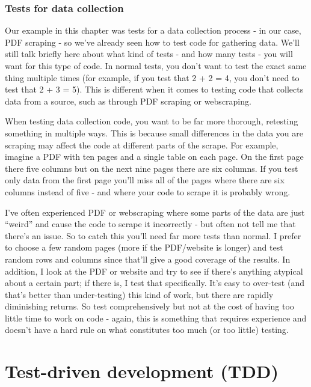 \documentclass[
  a4paper,
]{krantz}
\begin{document}
\hypertarget{tests-for-data-collection}{%
\subsubsection{Tests for data
collection}\label{tests-for-data-collection}}

Our example in this chapter was tests for a data collection
process - in our case, PDF scraping - so we've already seen
how to test code for gathering data. We'll still talk
briefly here about what kind of tests - and how many tests -
you will want for this type of code. In normal tests, you
don't want to test the exact same thing multiple times (for
example, if you test that 2 + 2 = 4, you don't need to test
that 2 + 3 = 5). This is different when it comes to testing
code that collects data from a source, such as through PDF
scraping or webscraping.

When testing data collection code, you want to be far more
thorough, retesting something in multiple ways. This is
because small differences in the data you are scraping may
affect the code at different parts of the scrape. For
example, imagine a PDF with ten pages and a single table on
each page. On the first page there five columns but on the
next nine pages there are six columns. If you test only data
from the first page you'll miss all of the pages where there
are six columns instead of five - and where your code to
scrape it is probably wrong.

I've often experienced PDF or webscraping where some parts
of the data are just ``weird'' and cause the code to scrape
it incorrectly - but often not tell me that there's an
issue. So to catch this you'll need far more tests than
normal. I prefer to choose a few random pages (more if the
PDF/website is longer) and test random rows and columns
since that'll give a good coverage of the results. In
addition, I look at the PDF or website and try to see if
there's anything atypical about a certain part; if there is,
I test that specifically. It's easy to over-test (and that's
better than under-testing) this kind of work, but there are
rapidly diminishing returns. So test comprehensively but not
at the cost of having too little time to work on code -
again, this is something that requires experience and
doesn't have a hard rule on what constitutes too much (or
too little) testing.

\hypertarget{test-driven-development-tdd}{%
\section{Test-driven development
(TDD)}\label{test-driven-development-tdd}}
\end{document}
